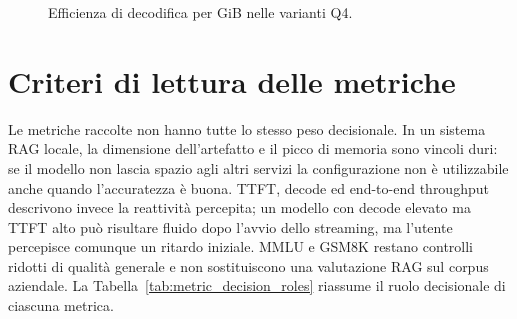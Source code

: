 \begin{figure}[ht]
  \centering
  \caption{Efficienza di decodifica per GiB nelle varianti Q4.}
  \label{fig:decode_per_gib_q4}
\end{figure}

\section{Criteri di lettura delle metriche}
\label{sec:evaluation_metric_interpretation}

Le metriche raccolte non hanno tutte lo stesso peso decisionale. In un sistema
RAG locale, la dimensione dell'artefatto e il picco di memoria sono vincoli
duri: se il modello non lascia spazio agli altri servizi la configurazione non
è utilizzabile anche quando l'accuratezza è buona. TTFT, decode ed end-to-end
throughput descrivono invece la reattività percepita; un modello con decode
elevato ma TTFT alto può risultare fluido dopo l'avvio dello streaming, ma
l'utente percepisce comunque un ritardo iniziale. MMLU e GSM8K restano controlli
ridotti di qualità generale e non sostituiscono una valutazione RAG sul corpus
aziendale.
La Tabella~\ref{tab:metric_decision_roles} riassume il ruolo decisionale di
ciascuna metrica.


